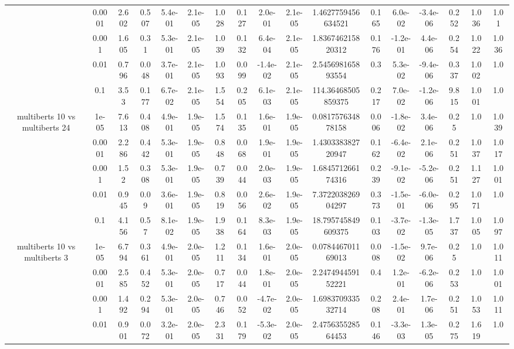 \begin{tabular}{|c|c|c|c|c|c|c|c|c|c|c|c|c|c|c|c|c|}
 & 0.0001 & 2.602 & 0.507 & 5.4e-01 & 2.1e-05 & 1.028 & 0.127 & 2.0e-01 & 2.1e-05 & 1.4627759456634521 & 0.165 & 6.0e-02 & -3.4e-06 & 0.252 & 1.036 & 1.01 \\
 & 0.001 & 1.605 & 0.31 & 5.3e-01 & 2.1e-05 & 1.039 & 0.132 & 6.4e-04 & 2.1e-05 & 1.836746215820312 & 0.176 & -1.2e-01 & 4.4e-06 & 0.254 & 1.022 & 1.036 \\
 & 0.01 & 0.796 & 0.048 & 3.7e-01 & 2.1e-05 & 1.093 & 0.099 & -1.4e-02 & 2.1e-05 & 2.545698165893554 & 0.3 & 5.3e-02 & -9.4e-06 & 0.337 & 1.002 & 1.0 \\
 & 0.1 & 3.53 & 0.177 & 6.7e-02 & 2.1e-05 & 1.554 & 0.205 & 6.1e-03 & 2.1e-05 & 114.36468505859375 & 0.217 & 7.0e-02 & -1.2e-06 & 9.815 & 1.001 & 1.0 \\
\hline
\multirow{5}{*}{multiberts 10 vs multiberts 24} & 1e-05 & 7.613 & 0.408 & 4.9e-01 & 1.9e-05 & 1.574 & 0.135 & 1.6e-01 & 1.9e-05 & 0.081757634878158 & 0.006 & -1.8e-02 & 3.4e-06 & 0.25 & 1.0 & 1.039 \\
 & 0.0001 & 2.286 & 0.442 & 5.3e-01 & 1.9e-05 & 0.848 & 0.068 & 1.9e-01 & 1.9e-05 & 1.430338382720947 & 0.162 & -6.4e-02 & 2.1e-06 & 0.251 & 1.037 & 1.017 \\
 & 0.001 & 1.52 & 0.308 & 5.3e-01 & 1.9e-05 & 0.739 & 0.044 & 2.0e-03 & 1.9e-05 & 1.684571266174316 & 0.239 & -9.1e-02 & -5.2e-06 & 0.251 & 1.127 & 1.001 \\
 & 0.01 & 0.945 & 0.09 & 3.6e-01 & 1.9e-05 & 0.819 & 0.056 & 2.6e-02 & 1.9e-05 & 7.372203826904297 & 0.373 & -1.5e-01 & -6.0e-06 & 0.295 & 1.071 & 1.0 \\
 & 0.1 & 4.156 & 0.57 & 8.1e-02 & 1.9e-05 & 1.938 & 0.164 & 8.3e-03 & 1.9e-05 & 18.795745849609375 & 0.103 & -3.7e-02 & -1.3e-05 & 1.737 & 1.005 & 1.097 \\
\hline
\multirow{5}{*}{multiberts 10 vs multiberts 3} & 1e-05 & 6.794 & 0.361 & 4.9e-01 & 2.0e-05 & 1.211 & 0.134 & 1.6e-01 & 2.0e-05 & 0.078446701169013 & 0.008 & -1.5e-02 & 9.7e-06 & 0.25 & 1.0 & 1.011 \\
 & 0.0001 & 2.585 & 0.452 & 5.3e-01 & 2.0e-05 & 0.717 & 0.044 & 1.8e-01 & 2.0e-05 & 2.247494459152221 & 0.4 & 1.2e-01 & -6.2e-06 & 0.253 & 1.0 & 1.001 \\
 & 0.001 & 1.492 & 0.294 & 5.3e-01 & 2.0e-05 & 0.746 & 0.052 & -4.7e-02 & 2.0e-05 & 1.698370933532714 & 0.208 & 2.4e-01 & 1.7e-06 & 0.251 & 1.053 & 1.011 \\
 & 0.01 & 0.901 & 0.072 & 3.2e-01 & 2.0e-05 & 2.331 & 0.179 & -5.3e-02 & 2.0e-05 & 2.475635528564453 & 0.146 & -3.3e-03 & 1.3e-05 & 0.275 & 1.619 & 1.0 \\

\end{tabular}
